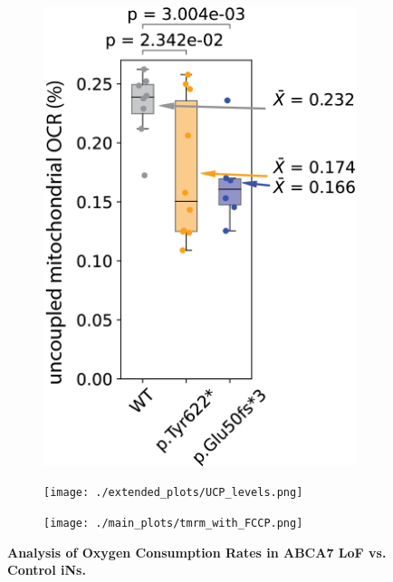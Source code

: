 \begin{figure}[H]
\begin{subfigure}[t]{0.25\textwidth}
    \end{subfigure} 
    \begin{subfigure}[t]{0.25\textwidth}
        \caption{}
        \includegraphics[width=\textwidth]{./extended_plots/uncoupling_quantification_batch2.png}        
    \end{subfigure} 
    \hspace{1cm}
    \begin{subfigure}[t]{0.2\textwidth}
        \caption{}
        \texttt{[image: ./extended\_plots/UCP\_levels.png]}        
    \end{subfigure} 
    \par
    \centering
    \begin{subfigure}[t]{0.65\textwidth}
        \caption{}
        \texttt{[image: ./main\_plots/tmrm\_with\_FCCP.png]}        
    \end{subfigure} 
    \caption{
         \textbf{Analysis of Oxygen Consumption Rates in ABCA7 LoF vs. Control iNs.}\\
     }
     \label{fig:oxygen_consumption_rates_iPSC_neurons}
 \end{figure}
